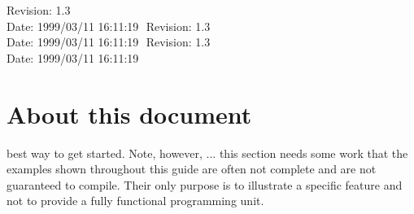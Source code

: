 %
%
%
%
%
%
%
%
%
%
%
  {\LARGE $ $Revision: 1.3 $ $}  \\[5mm] %
  {\LARGE $ $Date: 1999/03/11 16:11:19 $ $}  %
%
%
%
%
  {\LARGE $ $Revision: 1.3 $ $}  \\[5mm] %
  {\LARGE $ $Date: 1999/03/11 16:11:19 $ $}  %
%
  {\LARGE $ $Revision: 1.3 $ $}  \\[5mm] %
  {\LARGE $ $Date: 1999/03/11 16:11:19 $ $}  %
%
\section{About this document}
best way to get started. Note, however,
... this section needs some work
that the examples shown throughout this guide are often not complete
and are not guaranteed to compile. Their only purpose is to illustrate
a specific feature and not to provide a fully functional programming unit.

